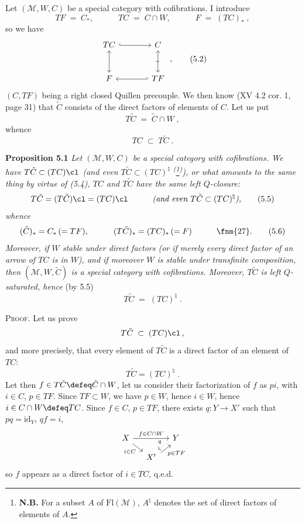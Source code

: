 Let $(\mathcal{M}, W, C)$ be a special category with cofibrations. I introduce
\[
TF \;=\; C_{*}, \qquad\quad TC \;=\; C \cap W, \qquad\quad F \;=\; (TC)_{*} \; ,
\tag*{(5.1)}
\]
so we have
\[
\begin{tikzcd}[row sep=large, column sep=large]
TC \arrow[r, hook] \arrow[d, leftrightarrow] & C \arrow[d, leftrightarrow, "\shortmid"{marking, sloped}] \\
F & TF \arrow[l, hook']
\end{tikzcd} \; ,
\tag*{(5.2)}
\]
$(C, TF)$ being a right closed Quillen precouple. We then know (XV 4.2 cor. 1, page 31) that $\tilde{C}$ consists of the direct factors of elements of $C$. Let us put
\[
T\tilde{C} \;=\; \tilde{C} \cap W \; ,
\tag*{(5.3)}
\]
whence
\[
TC \;\subset\; T\tilde{C} \; .
\tag*{(5.4)}
\]

\textbf{Proposition 5.1} \textit{Let $(\mathcal{M}, W, C)$ be a special category with cofibrations. We have $T\tilde{C} \subset (TC)\cl$ (and even $T\tilde{C} \subset (TC)^{\natural}$ \textsuperscript{(}\footnote[26]{\textbf{N.B.} For a subset $A$ of $\mathrm{Fl}(\mathcal{M})$, $A^{\natural}$ denotes the set of direct factors of elements of $A$.}\textsuperscript{)}), or what amounts to the same thing by virtue of (5.4), $TC$ and $T\tilde{C}$ have the same left $Q$-closure:}
\[
T\tilde{C} = (T\tilde{C})\cl = (TC)\cl \qquad\quad \textit{(and even } T\tilde{C} \subset (TC)^{\natural}\textit{),}
\tag*{(5.5)}
\]
\textit{whence}
\[
(\tilde{C})_{*} = C_{*} \, (= TF), \qquad\quad (T\tilde{C})_{*} = (TC)_{*} \, (= F) \qquad\quad \text{\fnm{27}}.
\tag*{(5.6)}
\]
\textit{Moreover, if $W$ stable under direct factors (or if merely every direct factor of an arrow of $TC$ is in $W$), and if moreover $W$ is stable under transfinite composition, then $(\mathcal{M}, W, \tilde{C})$ is a special category with cofibrations. Moreover, $T\tilde{C}$ is left $Q$-saturated, hence} (by 5.5)
\[
T\tilde{C} \;=\; (TC)^{\natural} \; .
\tag*{(5.7)}
\]


\textsc{Proof}. Let us prove
\[
T\tilde{C} \;\subset\; (TC)\cl \, ,
\]
and more precisely, that every element of $T\tilde{C}$ is a direct factor of an element of $TC$:
\[
T\tilde{C} = (TC)^{\natural} \; .
\]
Let then $f \in T\tilde{C} \defeq \tilde{C}\cap W$, let us consider their factorization of $f$ as $pi$, with $i \in C$, $p \in TF$. Since $TF \subset W$, we have $p \in W$, hence $i \in W$, hence $i \in C \cap W \defeq TC$. Since $f \in C$, $p \in TF$, there exists $q : Y \longrightarrow X'$ such that $pq = \mathrm{id}_Y$, $qf = i$,
\[
\begin{tikzcd}[column sep=small, row sep=small]
X \arrow[rr, "f\in C\cap W"] \arrow[dr, "i\in C"'] & & Y \arrow[dl, dotted, shift right, "q"'] \\
& X' \arrow[ur, shift right, "p\in TF"'] &
\end{tikzcd}
\]
so $f$ appears as a direct factor of $i \in TC$, q.e.d.

